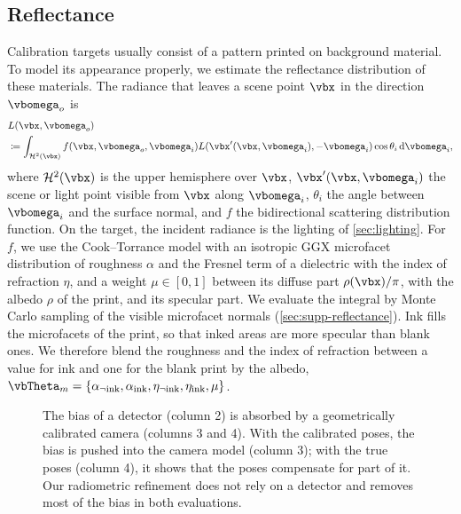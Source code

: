 \subsection{Reflectance}
\label{sec:reflectance}
Calibration targets usually consist of a pattern printed on background material. To model its appearance properly, we estimate the reflectance distribution of these materials. The radiance that leaves a scene point $\vbx$ in the direction $\vbomega_o$ is \cite{pharr2023physically}
\begin{align}
    &L(\vbx,\vbomega_o)\label{eq:scene-rad}\\
    &\coloneqq \int_{\mathcal{H}^2(\vbx)}f(\vbx, \vbomega_o,\vbomega_i)L(\vbx'(\vbx,\vbomega_i),-\vbomega_i)\cos\theta_i\odif\vbomega_i\nonumber,
\end{align}
where $\mathcal{H}^2(\vbx)$ is the upper hemisphere over $\vbx$,
$\vbx'(\vbx,\vbomega_i)$ the scene or light point visible from $\vbx$
along $\vbomega_i$, $\theta_i$ the angle between $\vbomega_i$ and the
surface normal, and $f$ the bidirectional scattering distribution
function. On the target, the incident radiance is the lighting of
\cref{sec:lighting}. For $f$, we use the Cook--Torrance model
\cite{cookTorrance} with an isotropic GGX microfacet distribution of
roughness $\alpha$ \cite{Heitz2014Microfacet} and the Fresnel term
of a dielectric with the index of refraction $\eta$, and a weight
$\mu\in[0,1]$ between its diffuse part $\rho(\vbx)/\pi$, with the
albedo $\rho$ of the print, and its specular part. We evaluate the
integral by Monte Carlo sampling of the visible microfacet normals
\cite{sphericalCaps} (\cref{sec:supp-reflectance}). Ink fills the
microfacets of the print, so that inked areas are more specular than
blank ones. We therefore blend the roughness and the index of
refraction between a value for ink and one for the blank print by
the albedo, $\vbTheta_m = \{\alpha_{\neg\text{ink}},
\alpha_{\text{ink}},\eta_{\neg\text{ink}}, \eta_{\text{ink}}, \mu\}$.

\begin{figure}[t]
        \centering
        
        \caption{The bias of a detector (column 2) is absorbed by a geometrically calibrated camera (columns 3 and 4). With the calibrated poses, the bias is pushed into the camera model (column 3); with the true poses (column 4), it shows that the poses compensate for part of it. Our radiometric refinement does not rely on a detector and removes most of the bias in both evaluations.}
        \label{fig:detector-bias}
\end{figure}
